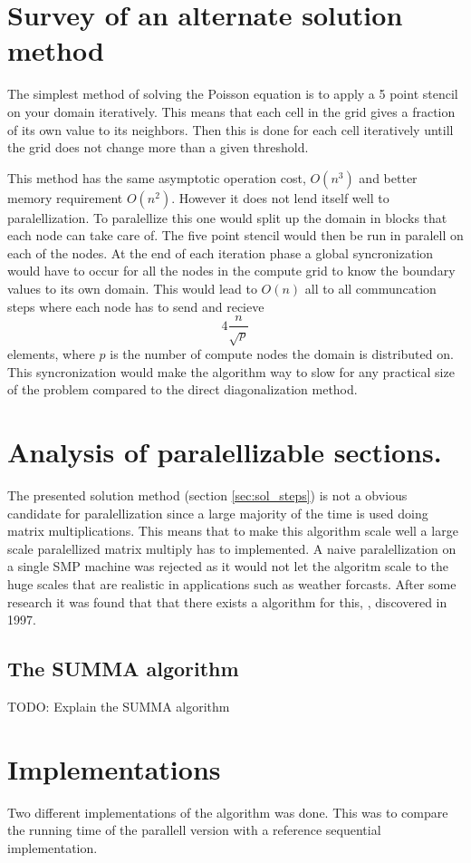 \documentclass{article}
\begin{document}
\section{Survey of an alternate solution method}
The simplest method of solving the Poisson equation is to apply a 5 point stencil on your domain
iteratively. This means that each cell in the grid gives a fraction of its own value to its neighbors.
Then this is done for each cell iteratively untill the grid does not change more than a given threshold.

This method has the same asymptotic operation cost, $O(n^3)$ and better memory requirement $O(n^2)$.
However it does not lend itself well to paralellization. To paralellize this one would split
up the domain in blocks that each node can take care of. The five point stencil would then be
run in paralell on each of the nodes. At the end of each iteration phase a global
syncronization would have to occur for all the nodes in the compute grid to know the boundary values
to its own domain. This would lead to $O(n)$ all to all communcation steps where each node has to
send and recieve
\[
4\frac{n}{\sqrt{p}}
\]
elements, where $p$ is the number of compute nodes the domain is distributed on.
This syncronization would make the algorithm way to slow for any practical size
of the problem compared to the direct diagonalization method.

\section{Analysis of paralellizable sections.}
The presented solution method (section \ref{sec:sol_steps}) is not a obvious candidate for paralellization
since a large majority of the time is used doing matrix multiplications.
This means that to make this algorithm scale well a large scale paralellized
matrix multiply has to implemented. A naive paralellization on a single SMP machine
was rejected as it would not let the algoritm scale to the huge scales that are realistic
in applications such as weather forcasts.
After some research it was found that that there exists a algorithm for this, \cite{summa}, discovered in 1997.

\subsection{The SUMMA algorithm}
TODO: Explain the SUMMA algorithm

\section{Implementations}
Two different implementations of the algorithm was done.
This was to compare the running time of the parallell version with a reference
sequential implementation.
\end{document}
